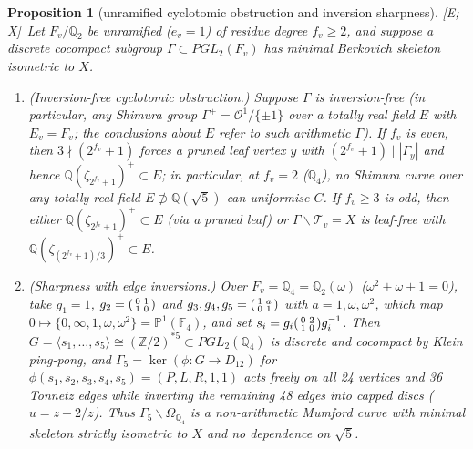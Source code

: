 \documentclass[11pt]{amsart}
\numberwithin{equation}{section}
\theoremstyle{plain}
\newtheorem{proposition}[theorem]{Proposition}
\theoremstyle{definition}\newtheorem{definition}[theorem]{Definition}
\theoremstyle{remark}\newtheorem{remark}[theorem]{Remark}
\newcommand{\Z}{\mathbb{Z}}\newcommand{\Q}{\mathbb{Q}}\newcommand{\C}{\mathbb{C}}\newcommand{\F}{\mathbb{F}}\newcommand{\R}{\mathbb{R}}
\newcommand{\ctag}[1]{\textup{\textsf{\scriptsize[#1]}}}
\begin{document}
\begin{proposition}[unramified cyclotomic obstruction and inversion sharpness]\label{prop:cyclotomic}
\ctag{E; X}\ Let $F_v/\Q_2$ be unramified ($e_v=1$) of residue degree $f_v\ge2$, and suppose a discrete cocompact subgroup $\Gamma\subset PGL_2(F_v)$ has minimal Berkovich skeleton isometric to $X$.
\begin{enumerate}[label=(\alph*),nosep]
\item \emph{(Inversion-free cyclotomic obstruction.)} Suppose $\Gamma$ is inversion-free (in particular, any Shimura group $\Gamma^+=\mathcal O^1/\{\pm1\}$ over a totally real field $E$ with $E_v=F_v$; the conclusions about $E$ refer to such arithmetic $\Gamma$). If $f_v$ is even, then $3\nmid(2^{f_v}+1)$ forces a pruned leaf vertex $y$ with $(2^{f_v}+1)\mid|\Gamma_y|$ and hence $\Q(\zeta_{2^{f_v}+1})^+\subset E$; in particular, at $f_v=2$ ($\Q_4$), no Shimura curve over any totally real field $E\not\supset\Q(\sqrt5)$ can uniformise $C$. If $f_v\ge3$ is odd, then either $\Q(\zeta_{2^{f_v}+1})^+\subset E$ (via a pruned leaf) or $\Gamma\backslash\mathcal T_v=X$ is leaf-free with $\Q(\zeta_{(2^{f_v}+1)/3})^+\subset E$.
\item \emph{(Sharpness with edge inversions.)} Over $F_v=\Q_4=\Q_2(\omega)$ ($\omega^2+\omega+1=0$), take $g_1=1$, $g_2=\begin{psmallmatrix}0&1\\1&0\end{psmallmatrix}$ and $g_3,g_4,g_5=\begin{psmallmatrix}1&a\\0&1\end{psmallmatrix}$ with $a=1,\omega,\omega^2$, which map $0\mapsto\{0,\infty,1,\omega,\omega^2\}=\mathbb P^1(\F_4)$, and set $s_i=g_i\begin{psmallmatrix}0&2\\1&0\end{psmallmatrix}g_i^{-1}$. Then $G=\langle s_1,\dots,s_5\rangle\cong(\Z/2)^{*5}\subset PGL_2(\Q_4)$ is discrete and cocompact by Klein ping-pong, and $\Gamma_5=\ker(\phi:G\to D_{12})$ for $\phi(s_1,s_2,s_3,s_4,s_5)=(P,L,R,1,1)$ acts freely on all 24 vertices and 36 Tonnetz edges while inverting the remaining 48 edges into capped discs ($u=z+2/z$). Thus $\Gamma_5\backslash\Omega_{\Q_4}$ is a non-arithmetic Mumford curve with minimal skeleton strictly isometric to $X$ and no dependence on $\sqrt5$.
\end{enumerate}
\end{proposition}
\end{document}
